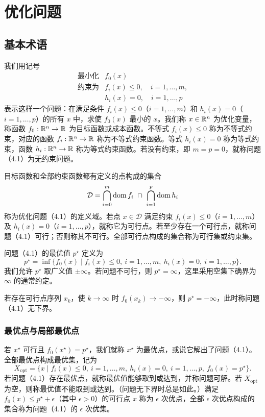 \section{优化问题}
\subsection{基本术语}
我们用记号
\begin{equation}
\begin{array}{ll}
\text{最小化}&f_0(x)\\
\text{约束为}&f_i(x)\le0,\quad i=1,\ldots,m,\\
&h_i(x)=0,\quad i=1,\ldots,p
\end{array}\tag{4.1}
\end{equation}
表示这样一个问题：在满足条件 $f_i(x)\le0$（$i=1,\ldots,m$）和 $h_i(x)=0$（$i=1,\ldots,p$）的所有 $x$ 中，求使 $f_0(x)$ 最小的 $x$。我们称 $x\in\mathbb R^n$ 为优化变量，称函数 $f_0:\mathbb R^n\to\mathbb R$ 为目标函数或成本函数。不等式 $f_i(x)\le0$ 称为不等式约束，对应的函数 $f_i:\mathbb R^n\to\mathbb R$ 称为不等式约束函数。等式 $h_i(x)=0$ 称为等式约束，函数 $h_i:\mathbb R^n\to\mathbb R$ 称为等式约束函数。若没有约束，即 $m=p=0$，就称问题（4.1）为无约束问题。

目标函数和全部约束函数都有定义的点构成的集合
\[
\mathcal D=\bigcap_{i=0}^m\dom f_i\ \cap\ \bigcap_{i=1}^p\dom h_i
\]
称为优化问题（4.1）的定义域。若点 $x\in\mathcal D$ 满足约束 $f_i(x)\le0$（$i=1,\ldots,m$）及 $h_i(x)=0$（$i=1,\ldots,p$），就称它为可行点。若至少存在一个可行点，就称问题（4.1）可行；否则称其不可行。全部可行点构成的集合称为可行集或约束集。

问题（4.1）的最优值 $p^\star$ 定义为
\[
p^\star=\inf\{f_0(x)\mid f_i(x)\le0,\ i=1,\ldots,m,\ h_i(x)=0,\ i=1,\ldots,p\}.
\]
我们允许 $p^\star$ 取广义值 $\pm\infty$。若问题不可行，则 $p^\star=\infty$，这里采用空集下确界为 $\infty$ 的通常约定。

若存在可行点序列 $x_k$，使 $k\to\infty$ 时 $f_0(x_k)\to-\infty$，则 $p^\star=-\infty$，此时称问题（4.1）无下界。

\subsubsection*{最优点与局部最优点}
若 $x^\star$ 可行且 $f_0(x^\star)=p^\star$，我们就称 $x^\star$ 为最优点，或说它解出了问题（4.1）。全部最优点构成最优集，记为
\[
X_{\mathrm{opt}}=\{x\mid f_i(x)\le0,\ i=1,\ldots,m,\ h_i(x)=0,\ i=1,\ldots,p,\ f_0(x)=p^\star\}.
\]
若问题（4.1）存在最优点，就称最优值能够取到或达到，并称问题可解。若 $X_{\mathrm{opt}}$ 为空，则称最优值不能取到或达到。（问题无下界时总是如此。）满足 $f_0(x)\le p^\star+\epsilon$（其中 $\epsilon>0$）的可行点 $x$ 称为 $\epsilon$ 次优点，全部 $\epsilon$ 次优点构成的集合称为问题（4.1）的 $\epsilon$ 次优集。

